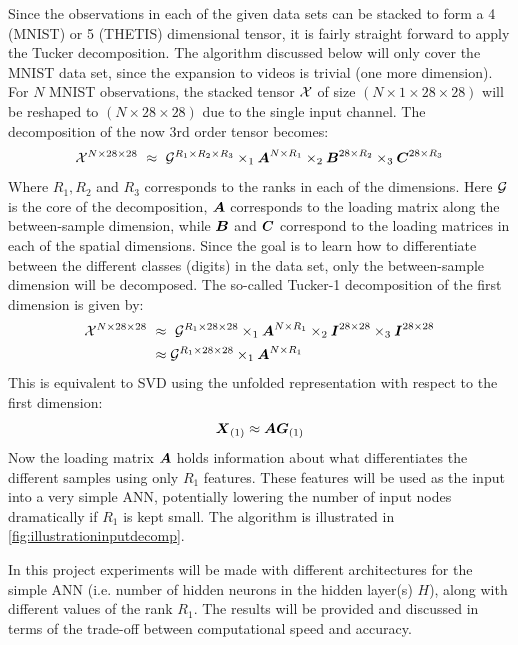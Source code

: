 Since the observations in each of the given data sets can be stacked to form a 4 (MNIST) or 5 (THETIS) dimensional tensor, it is fairly straight forward to apply the Tucker decomposition. The algorithm discussed below will only cover the MNIST data set, since the expansion to videos is trivial (one more dimension). For $N$ MNIST observations, the stacked tensor $\mathcal{X}$ of size $(N \times 1 \times 28 \times 28)$ will be reshaped to $(N\times 28 \times 28)$ due to the single input channel. The decomposition of the now 3rd order tensor becomes:
\begin{equation}
    \mathcal{X}^{N\times 28 \times 28} \ \approx \  \mathcal{G}^{R_1\times R_2 \times R_3} \times_1 \boldsymbol{A}^{N\times R_1} \times_2 \boldsymbol{B}^{28 \times R_2} \times_3 \boldsymbol{C}^{28 \times R_3}
\end{equation}
Where $R_1, R_2$ and $R_3$ corresponds to the ranks in each of the dimensions. Here $\mathcal{G}$ is the core of the decomposition, $\boldsymbol{A}$ corresponds to the loading matrix along the between-sample dimension, while $\boldsymbol{B}$ and $\boldsymbol{C}$ correspond to the loading matrices in each of the spatial dimensions. Since the goal is to learn how to differentiate between the different classes (digits) in the data set, only the between-sample dimension will be decomposed. The so-called Tucker-1 decomposition of the first dimension is given by:
\begin{align}
    \mathcal{X}^{N\times 28 \times 28} \ &\approx \  \mathcal{G}^{R_1\times 28 \times 28} \times_1 \boldsymbol{A}^{N\times R_1} \times_2 \boldsymbol{I}^{28 \times 28} \times_3 \boldsymbol{I}^{28 \times 28} \\
    &\approx \mathcal{G}^{R_1\times 28 \times 28} \times_1 \boldsymbol{A}^{N\times R_1}
\end{align}
This is equivalent to SVD using the unfolded representation with respect to the first dimension:
\begin{equation}
    \boldsymbol{X}_{(1)} \approx \boldsymbol{A} \boldsymbol{G}_{(1)}
    \label{eq:tuckerMNISTinput}
\end{equation}
Now the loading matrix $\boldsymbol{A}$ holds information about what differentiates the different samples using only $R_1$ features. These features will be used as the input into a very simple ANN, potentially lowering the number of input nodes dramatically if $R_1$ is kept small. The algorithm is illustrated in \autoref{fig:illustrationinputdecomp}.

In this project experiments will be made with different architectures for the simple ANN (i.e. number of hidden neurons in the hidden layer(s) $H$), along with different values of the rank $R_1$. The results will be provided and discussed in terms of the trade-off between computational speed and accuracy.

